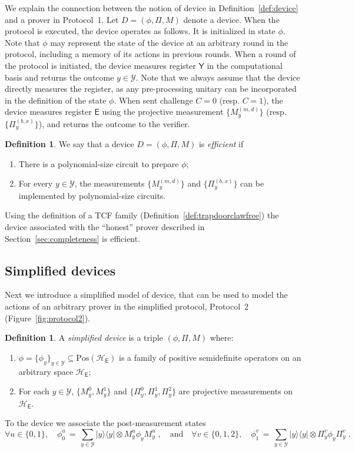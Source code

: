 \documentclass[11pt]{article}
\theoremstyle{remark}
\theoremstyle{definition}
\newtheorem{definition}[theorem]{Definition}
\newcommand{\ket}[1]{|#1\rangle}
\newcommand{\bra}[1]{\langle#1|}
\newcommand{\proj}[1]{\ket{#1}\!\bra{#1}}
\newcommand{\reg}[1]{{\textsf{#1}}}
\newcommand{\mY}{\ensuremath{\mathcal{Y}}}
\newcommand{\mH}{\mathcal{H}}
\newcommand{\setft}[1]{\mathrm{#1}}
\newcommand{\Pos}{\setft{Pos}}
\begin{document}
We explain the connection between the notion of device in Definition~\ref{def:device} and a prover in Protocol~1. 
Let $D = (\phi,\Pi,M)$ denote a device. When the protocol is executed, the device operates as follows. It is initialized in state $\phi$. Note that $\phi$ may represent the state of the device at an arbitrary round in the protocol, including a memory of its actions in previous rounds. When a round of the protocol is initiated, the device measures register $\reg{Y}$ in the computational basis and returns the outcome $y\in\mY$. Note that we always assume that the device directly measures the register, as any pre-processing unitary can be incorporated  in the definition of the state $\phi$. When sent challenge $C=0$ (resp. $C=1$), the device measures register $\reg{E}$ using the projective measurement $\{M_y^{(m,d)}\}$ (resp. $\{\Pi_y^{(b,x)}\}$), and returns the outcome to the verifier. 

\begin{definition}
We say that a device $D = (\phi,\Pi,M)$ is \emph{efficient} if
\begin{enumerate}
\item There is a polynomial-size circuit to prepare $\phi$;
\item For every $y\in\mY$, the measurements $\{M_y^{(m,d)}\}$ and $\{\Pi_y^{(b,x)}\}$ can be implemented by polynomial-size circuits. 
\end{enumerate}
\end{definition}

Using the definition of a TCF family (Definition~\ref{def:trapdoorclawfree}) the device associated with the ``honest'' prover described in Section~\ref{sec:completeness} is efficient. 


\subsection{Simplified devices}
\label{sec:binary}

Next we introduce a simplified model of device, that can be used to model the actions of an arbitrary prover in the simplified protocol, Protocol~2 (Figure~\ref{fig:protocol2}). 


\begin{definition}\label{def:binary-device}
A \emph{simplified device} is a triple $(\phi,\Pi,M)$ where:
\begin{enumerate}
\item $\phi=\{\phi_y\}_{y\in\mY} \subseteq \Pos(\mH_\reg{E})$ is a family of positive semidefinite operators on an arbitrary space $\mH_\reg{E}$; 
\item For each $y\in\mY$, $\{M_y^0,M_y^1\}$ and $\{\Pi_y^0,\Pi_y^1,\Pi_y^2 \}$  are projective measurements on $\mH_\reg{E}$.
\end{enumerate}
 To the device we associate the post-measurement states
\begin{equation}\label{eq:def-pm}
\forall u\in\{0,1\},\quad \phi_0^u\,=\, \sum_{y\in\mY} \proj{y}\otimes M_y^u \phi_y M_y^u\;,\quad\text{and}\quad \forall v\in\{0,1,2\},\quad\phi_1^v \,=\, \sum_{y\in\mY} \proj{y}\otimes \Pi_y^v \phi_y \Pi_y^v\;.
\end{equation}
\end{definition}
\end{document}
